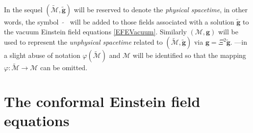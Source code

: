 \documentclass[10pt,a4paper]{article}
\theoremstyle{plain}
\def\bmg{{\bm g}}
\begin{document}
\medskip

In the sequel $(\tilde{\mathcal{M}},\tilde{\bmg})$ will be reserved to
denote the \emph{physical spacetime}, in other words, the symbol
$\tilde{ \quad}$ will be added to those fields associated with a
solution $\tilde{\bmg}$ to the vacuum Einstein field equations
\eqref{EFEVacuum}.  Similarly $(\mathcal{M},\bmg)$ will be used to
represent the \emph{unphysical spacetime} related to
$(\tilde{\mathcal{M}},\tilde{\bmg})$ via $\bmg=\Xi^2\tilde{\bmg}$.
---in a slight abuse of notation $\varphi(\tilde{\mathcal{M}})$ and
$\mathcal{M}$ will be identified so that the mapping $\varphi:
\tilde{\mathcal{M}}\rightarrow\mathcal{M}$ can be omitted.



\section{The  conformal Einstein field equations}
\label{Sec:CFEs}


 




\end{document}
